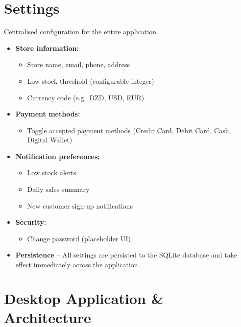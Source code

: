 \documentclass[12pt,a4paper]{article}
\begin{document}
\section{Settings}

Centralised configuration for the entire application.

\begin{itemize}[leftmargin=1.5em]
  \item \textbf{Store information:}
    \begin{itemize}
      \item Store name, email, phone, address
      \item Low stock threshold (configurable integer)
      \item Currency code (e.g.\ DZD, USD, EUR)
    \end{itemize}
  \item \textbf{Payment methods:}
    \begin{itemize}
      \item Toggle accepted payment methods (Credit Card, Debit Card, Cash,
            Digital Wallet)
    \end{itemize}
  \item \textbf{Notification preferences:}
    \begin{itemize}
      \item Low stock alerts
      \item Daily sales summary
      \item New customer sign-up notifications
    \end{itemize}
  \item \textbf{Security:}
    \begin{itemize}
      \item Change password (placeholder UI)
    \end{itemize}
  \item \textbf{Persistence} -- All settings are persisted to the SQLite
        database and take effect immediately across the application.
\end{itemize}

\section{Desktop Application \& Architecture}
\end{document}
